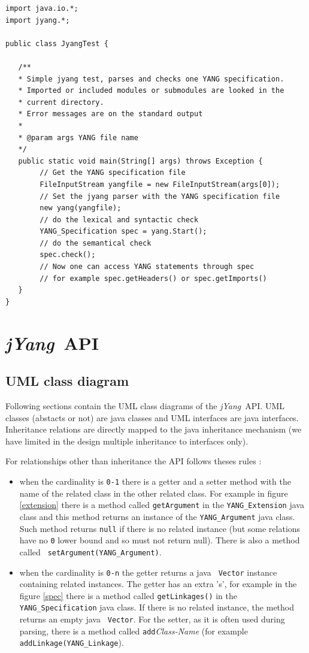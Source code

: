 \documentclass[a4paper]{article}
\newcommand{\jyang}{{\sl jYang}}
\begin{document}
\begin{lstlisting}
import java.io.*;
import jyang.*;

public class JyangTest {

   /**
   * Simple jyang test, parses and checks one YANG specification.
   * Imported or included modules or submodules are looked in the 
   * current directory.
   * Error messages are on the standard output
   * 
   * @param args YANG file name
   */
   public static void main(String[] args) throws Exception {
        // Get the YANG specification file
        FileInputStream yangfile = new FileInputStream(args[0]);
        // Set the jyang parser with the YANG specification file
        new yang(yangfile);
        // do the lexical and syntactic check
        YANG_Specification spec = yang.Start();
        // do the semantical check
        spec.check();
        // Now one can access YANG statements through spec
        // for example spec.getHeaders() or spec.getImports()
   }
}
\end{lstlisting}

\section{\jyang\ API}
\label{api}

\subsection{UML class diagram}

Following  sections contain  the  UML class  diagrams  of the  \jyang\
API. UML classes (abstacts or not) are java classes and UML interfaces
are java interfaces.  Inheritance relations are directly mapped to the
java  inheritance mechanism (we  have limited  in the  design multiple
inheritance to interfaces only).

For relationships other than inheritance the API follows theses rules :
\begin{itemize}
\item
when  the cardinality  is {\tt  0-1} there  is a  getter and  a setter
method  with  the name  of  the related  class  in  the other  related
class. For example in figure  \ref{extension} there is a method called
{\tt  getArgument} in the  {\tt YANG\_Extension}  java class  and this
method  returns   an  instance   of  the  {\tt   YANG\_Argument}  java
class. Such method returns {\tt  null} if there is no related instance
(but some relations have no {\tt 0} lower bound and so must not return
null).      There     is     also     a     method     called     {\tt
setArgument(YANG\_Argument)}.
\item
when  the cardinality  is {\tt  0-n} the  getter returns  a  java {\tt
Vector} instance containing related instances. The getter has an extra
's', for  example in  the figure \ref{spec}  there is a  method called
{\tt getLinkages()}  in the  {\tt YANG\_Specification} java  class. If
there is  no related instance, the  method returns an  empty java {\tt
Vector}. For the setter, as it  is often used during parsing, there is
a  method   called  {\tt   add}{\sl  Class-Name}  (for   example  {\tt
addLinkage(YANG\_Linkage}).
\end{itemize}
 
\end{document}
